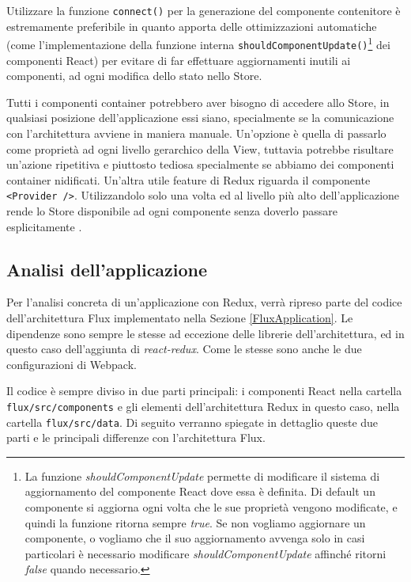 Utilizzare la funzione \texttt{connect()} per la generazione del componente contenitore è estremamente preferibile in quanto apporta delle ottimizzazioni automatiche (come l'implementazione della funzione interna \texttt{shouldComponentUpdate()}\footnote{La funzione \textit{shouldComponentUpdate} permette di modificare il sistema di aggiornamento del componente React dove essa è definita. Di default un componente si aggiorna ogni volta che le sue proprietà vengono modificate, e quindi la funzione ritorna sempre \textit{true}. Se non vogliamo aggiornare un componente, o vogliamo che il suo aggiornamento avvenga solo in casi particolari è necessario modificare \textit{shouldComponentUpdate} affinché ritorni \textit{false} quando necessario.} dei componenti React) per evitare di far effettuare aggiornamenti inutili ai componenti, ad ogni modifica dello stato nello Store.

Tutti i componenti container potrebbero aver bisogno di accedere allo Store, in qualsiasi posizione dell'applicazione essi siano, specialmente se la comunicazione con l'architettura avviene in maniera manuale. Un'opzione è quella di passarlo come proprietà ad ogni livello gerarchico della View, tuttavia potrebbe risultare un'azione ripetitiva e piuttosto tediosa specialmente se abbiamo dei componenti container nidificati. Un'altra utile feature di Redux riguarda il componente \texttt{<Provider />}. Utilizzandolo solo una volta ed al livello più alto dell'applicazione rende lo Store disponibile ad ogni componente senza doverlo passare esplicitamente \cite{ReduxDocumentation}.

\subsection{Analisi dell'applicazione}
Per l'analisi concreta di un'applicazione con Redux, verrà ripreso parte del codice dell'architettura Flux implementato nella Sezione \ref{FluxApplication}. Le dipendenze sono sempre le stesse ad eccezione delle librerie dell'architettura, ed in questo caso dell'aggiunta di \textit{react-redux}. Come le stesse sono anche le due configurazioni di Webpack.

Il codice è sempre diviso in due parti principali: i componenti React nella cartella \texttt{flux/src/components} e gli elementi dell'architettura Redux in questo caso, nella cartella \texttt{flux/src/data}. Di seguito verranno spiegate in dettaglio queste due parti e le principali differenze con l'architettura Flux.


